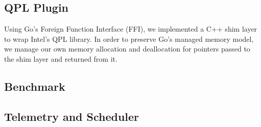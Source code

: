 \subsection{QPL Plugin}

Using Go's Foreign Function Interface (FFI), we implemented a C++ shim layer to wrap Intel's QPL library.
In order to preserve Go's managed memory model, we manage our own memory allocation and deallocation for pointers passed to the shim layer and returned from it.

\subsection{Benchmark}


\subsection{Telemetry and Scheduler}

